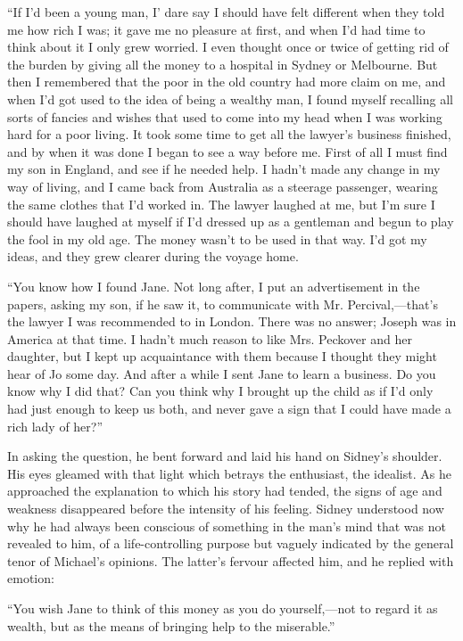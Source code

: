``If I'd been a young man, I' dare say I should have felt different when
they told me how rich I was; it gave me no pleasure at first, and when
I'd had time to think about it I only grew worried. I even thought once
or twice of getting rid of the burden by giving all the money to a
hospital in Sydney or {}Melbourne. But then I remembered that the poor
in the old country had more claim on me, and when I'd got used to the
idea of being a wealthy man, I found myself recalling all sorts of
fancies and wishes that used to come into my head when I was working
hard for a poor living. It took some time to get all the lawyer's
business finished, and by when it was done I began to see a way before
me. First of all I must find my son in England, and see if he needed
help. I hadn't made any change in my way of living, and I came back from
Australia as a steerage passenger, wearing the same clothes that I'd
worked in. The lawyer laughed at me, but I'm sure I should have laughed
at myself if I'd dressed up as a gentleman and begun to play the fool in
my old age. The money wasn't to be used in that way. I'd got my ideas,
and they grew clearer during the voyage home.

``You know how I found Jane. Not long after, I put an advertisement in
the papers, asking my son, if he saw it, to communicate with Mr.
Percival,---that's the lawyer I was {}recommended to in London. There
was no answer; Joseph was in America at that time. I hadn't much reason
to like Mrs. Peckover and her daughter, but I kept up acquaintance with
them because I thought they might hear of Jo some day. And after a while
I sent Jane to learn a business. Do you know why I did that? Can you
think why I brought up the child as if I'd only had just enough to keep
us both, and never gave a sign that I could have made a rich lady of
her?''

In asking the question, he bent forward and laid his hand on Sidney's
shoulder. His eyes gleamed with that light which betrays the enthusiast,
the idealist. As he approached the explanation to which his story had
tended, the signs of age and weakness disappeared before the intensity
of his feeling. Sidney understood now why he had always been conscious
of something in the man's mind that was not revealed to him, of a
life-controlling purpose but vaguely indicated by the general tenor of
Michael's opinions. The latter's fervour affected him, and he replied
with emotion:

{}``You wish Jane to think of this money as you do yourself,---not to
regard it as wealth, but as the means of bringing help to the
miserable.''

